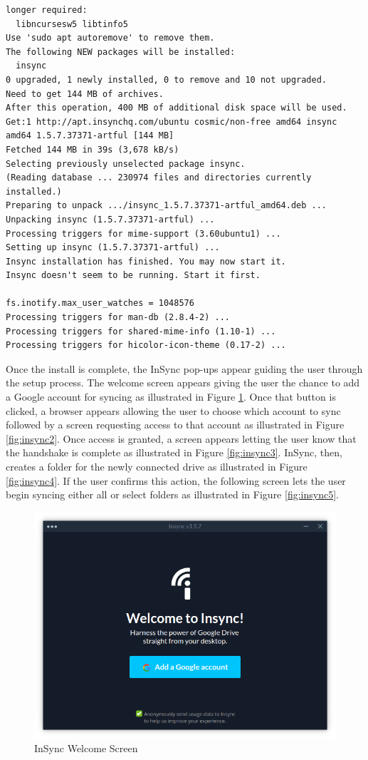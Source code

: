 \begin{verbatim}
longer required:
  libncursesw5 libtinfo5
Use 'sudo apt autoremove' to remove them.
The following NEW packages will be installed:
  insync
0 upgraded, 1 newly installed, 0 to remove and 10 not upgraded.
Need to get 144 MB of archives.
After this operation, 400 MB of additional disk space will be used.
Get:1 http://apt.insynchq.com/ubuntu cosmic/non-free amd64 insync 
amd64 1.5.7.37371-artful [144 MB]
Fetched 144 MB in 39s (3,678 kB/s)                                                                         
Selecting previously unselected package insync.
(Reading database ... 230974 files and directories currently 
installed.)
Preparing to unpack .../insync_1.5.7.37371-artful_amd64.deb ...
Unpacking insync (1.5.7.37371-artful) ...
Processing triggers for mime-support (3.60ubuntu1) ...
Setting up insync (1.5.7.37371-artful) ...
Insync installation has finished. You may now start it.
Insync doesn't seem to be running. Start it first.

fs.inotify.max_user_watches = 1048576
Processing triggers for man-db (2.8.4-2) ...
Processing triggers for shared-mime-info (1.10-1) ...
Processing triggers for hicolor-icon-theme (0.17-2) ...
\end{verbatim}
Once the install is complete, the InSync pop-ups appear guiding the user through the setup process. The welcome screen appears giving the user the chance to add a Google account for syncing as illustrated in Figure \ref{fig:insync1}. Once that button is clicked, a browser appears allowing the user to choose which account to sync followed by a screen requesting access to that account as illustrated in Figure \ref{fig:insync2}. Once access is granted, a screen appears letting the user know that the handshake is complete as illustrated in Figure \ref{fig:insync3}. InSync, then, creates a folder for the newly connected drive as illustrated in Figure \ref{fig:insync4}. If the user confirms this action, the following screen lets the user begin syncing either all or select folders as illustrated in Figure \ref{fig:insync5}. \\
\begin{figure}[htb]
  \centering
  \includegraphics[scale=0.4]{images/insync1.png}
  \caption{InSync Welcome Screen}
  \label{fig:insync1}
\end{figure}
